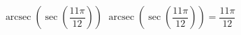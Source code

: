  {$\operatorname{arcsec}\left(\sec\left(\dfrac{11\pi}{12}\right) \right)$}
{ $\operatorname{arcsec}\left(\sec\left(\dfrac{11\pi}{12}\right) \right) = \dfrac{11\pi}{12}$}
